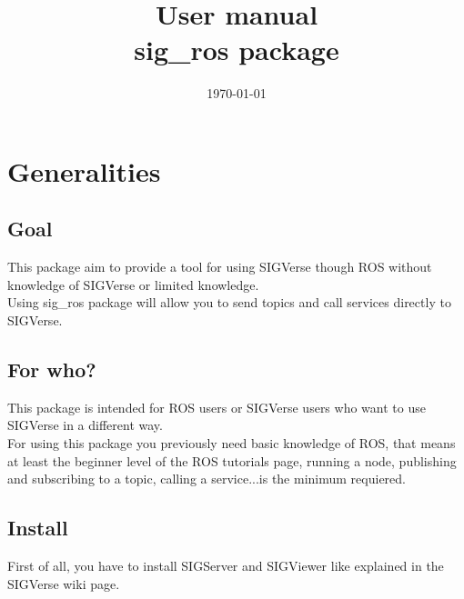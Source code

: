 \documentclass[notitlepage]{report}
\title{\textbf{User manual}\\sig\_ros package}
\author{}
\date{\today}
\begin{document}
\maketitle


%

 
\tableofcontents %
\setcounter{page}{2}
\chapter{Generalities}
\section{Goal}
This package aim to provide a tool for using SIGVerse\cite{SIGVerseWiki} though ROS without knowledge of SIGVerse or limited knowledge.\\
Using sig\_ros package will allow you to send topics and call services directly to SIGVerse.

\section{For who?}
This package is intended for ROS users or SIGVerse users who want to use SIGVerse in a different way.\\
For using this package you previously need basic knowledge of ROS, that means at least the beginner level of the ROS tutorials page\cite{ROSWiki}, running a node, publishing and subscribing to a topic, calling a service...is the minimum requiered.

\section{Install}
First of all, you have to install SIGServer\cite{SIGServerWiki} and SIGViewer\cite{SIGViewerWiki} like explained in the SIGVerse wiki page\cite{SIGVerseWiki}.
\end{document}
